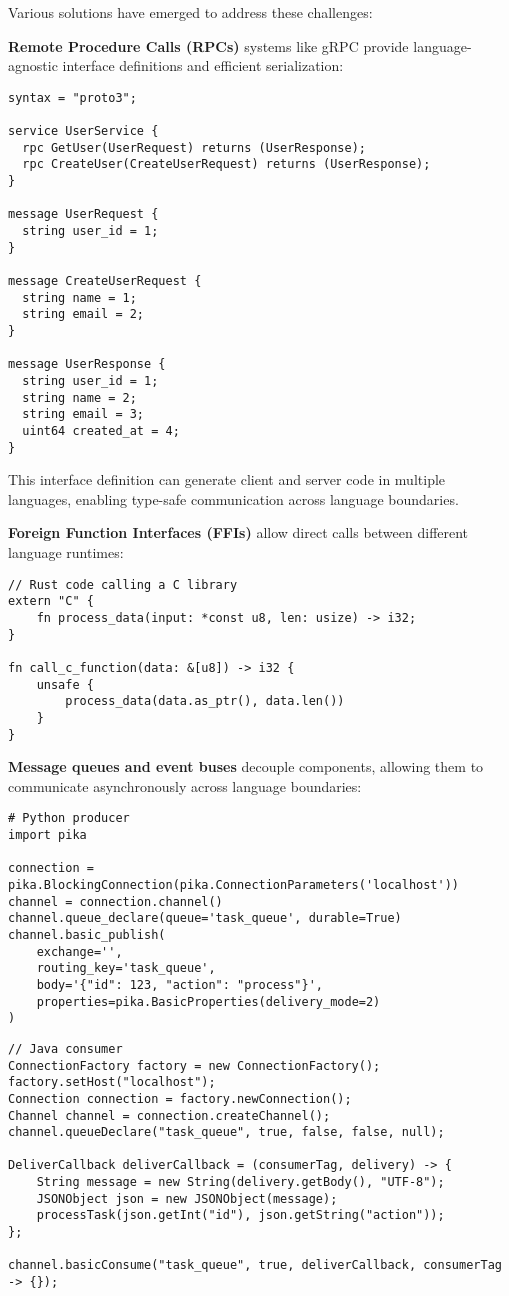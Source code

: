 \documentclass[11pt]{article}
\begin{document}
Various solutions have emerged to address these challenges:

\textbf{\textbf{Remote Procedure Calls (RPCs)}} systems like gRPC provide language-agnostic interface definitions and efficient serialization:

\begin{verbatim}
syntax = "proto3";

service UserService {
  rpc GetUser(UserRequest) returns (UserResponse);
  rpc CreateUser(CreateUserRequest) returns (UserResponse);
}

message UserRequest {
  string user_id = 1;
}

message CreateUserRequest {
  string name = 1;
  string email = 2;
}

message UserResponse {
  string user_id = 1;
  string name = 2;
  string email = 3;
  uint64 created_at = 4;
}
\end{verbatim}

This interface definition can generate client and server code in multiple languages, enabling type-safe communication across language boundaries.

\textbf{\textbf{Foreign Function Interfaces (FFIs)}} allow direct calls between different language runtimes:

\begin{verbatim}
// Rust code calling a C library
extern "C" {
    fn process_data(input: *const u8, len: usize) -> i32;
}

fn call_c_function(data: &[u8]) -> i32 {
    unsafe {
        process_data(data.as_ptr(), data.len())
    }
}
\end{verbatim}

\textbf{\textbf{Message queues and event buses}} decouple components, allowing them to communicate asynchronously across language boundaries:

\begin{verbatim}
# Python producer
import pika

connection = pika.BlockingConnection(pika.ConnectionParameters('localhost'))
channel = connection.channel()
channel.queue_declare(queue='task_queue', durable=True)
channel.basic_publish(
    exchange='',
    routing_key='task_queue',
    body='{"id": 123, "action": "process"}',
    properties=pika.BasicProperties(delivery_mode=2)
)
\end{verbatim}

\begin{verbatim}
// Java consumer
ConnectionFactory factory = new ConnectionFactory();
factory.setHost("localhost");
Connection connection = factory.newConnection();
Channel channel = connection.createChannel();
channel.queueDeclare("task_queue", true, false, false, null);

DeliverCallback deliverCallback = (consumerTag, delivery) -> {
    String message = new String(delivery.getBody(), "UTF-8");
    JSONObject json = new JSONObject(message);
    processTask(json.getInt("id"), json.getString("action"));
};

channel.basicConsume("task_queue", true, deliverCallback, consumerTag -> {});
\end{verbatim}
\end{document}
